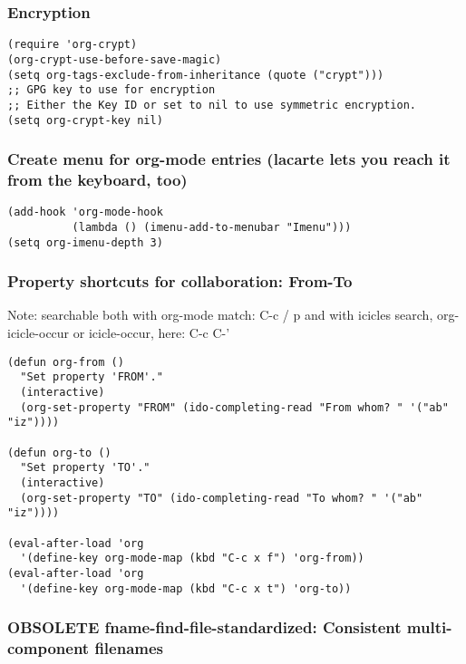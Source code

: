 \documentclass[nofonts]{tufte-handout}
\begin{document}
\subsubsection{Encryption}
\label{sec-2-5-15}

\begin{verbatim}
(require 'org-crypt)
(org-crypt-use-before-save-magic)
(setq org-tags-exclude-from-inheritance (quote ("crypt")))
;; GPG key to use for encryption
;; Either the Key ID or set to nil to use symmetric encryption.
(setq org-crypt-key nil)
\end{verbatim}

\subsubsection{Create menu for org-mode entries (lacarte lets you reach it from the keyboard, too)}
\label{sec-2-5-16}

\begin{verbatim}
(add-hook 'org-mode-hook
          (lambda () (imenu-add-to-menubar "Imenu")))
(setq org-imenu-depth 3)
\end{verbatim}

\subsubsection{Property shortcuts for collaboration: From-To}
\label{sec-2-5-17}

Note: searchable both with org-mode match: C-c / p and with icicles search,
org-icicle-occur or icicle-occur, here: C-c C-'

\begin{verbatim}
(defun org-from ()
  "Set property 'FROM'."
  (interactive)
  (org-set-property "FROM" (ido-completing-read "From whom? " '("ab" "iz"))))

(defun org-to ()
  "Set property 'TO'."
  (interactive)
  (org-set-property "TO" (ido-completing-read "To whom? " '("ab" "iz"))))

(eval-after-load 'org
  '(define-key org-mode-map (kbd "C-c x f") 'org-from))
(eval-after-load 'org
  '(define-key org-mode-map (kbd "C-c x t") 'org-to))
\end{verbatim}

\subsubsection{{\bfseries\sffamily OBSOLETE} fname-find-file-standardized: Consistent multi-component filenames}
\label{sec-2-5-18}
\end{document}
